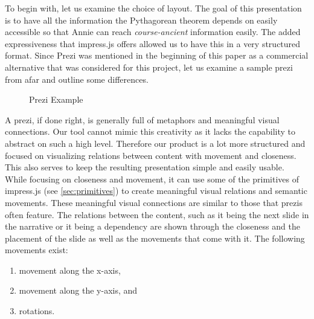 \documentclass[twoside, 12pt]{article}
\begin{document}
To begin with, let us examine the choice of layout. The goal of this presentation is to have all the information the Pythagorean theorem depends on easily accessible so that Annie can reach \textit{course-ancient} information easily. The added expressiveness that impress.js offers allowed us to have this in a very structured format. Since Prezi was mentioned in the beginning of this paper as a commercial alternative that was considered for this project, let us examine a sample prezi from afar and outline some differences.\\

\begin{figure}
\vspace{-26pt}
  \begin{center}
\vspace{-20pt}
  \caption{Prezi Example \cite{npentrel2:npentrel15}}
  \label{fig:preziExample}
\vspace{-24pt}
  \end{center}
\end{figure}

A prezi, if done right, is generally full of metaphors and meaningful visual connections. Our tool cannot mimic this creativity as it lacks the capability to abstract on such a high level. Therefore our product is a lot more structured and focused on visualizing relations between content with movement and closeness. This also serves to keep the resulting presentation simple and easily usable.\\

While focusing on closeness and movement, it can use some of the primitives of impress.js (see \autoref{sec:primitives}) to create meaningful visual relations and semantic movements. These meaningful visual connections are similar to those that prezis often feature. The relations between the content, such as it being the next slide in the narrative or it being a dependency are shown through the closeness and the placement of the slide as well as the movements that come with it. The following movements exist:\\
\vspace{-12pt}
\begin{enumerate}[topsep=0pt,itemsep=-1ex,partopsep=1ex,parsep=1ex]
\item movement along the x-axis,
\item movement along the y-axis, and
\item rotations.
\end{enumerate}
\vspace{5pt}
\end{document}
